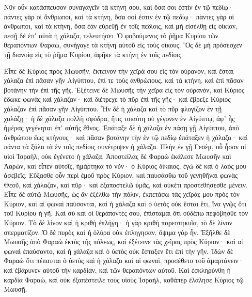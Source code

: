 {Νῦν οὖν κατάσπευσον συναγαγεῖν τὰ κτήνη σου, καὶ ὅσα σοι ἐστὶν ἐν τῷ πεδίῳ· πάντες γὰρ οἱ ἄνθρωποι, καὶ τὰ κτήνη, ὅσα σοί ἐστιν ἐν τῷ πεδίῳ· πὰντες γὰρ οἱ ἄνθρωποι, καὶ τὰ κτήνη, ὅσα ἐὰν εὑρεθῇ ἐν τοῖς πεδίοις, καὶ μὴ εἰσέλθῃ εἰς οἰκίαν, πεσῇ δὲ ἐπʼ αὐτὰ ἡ χάλαζα, τελευτήσει.
Ὁ φοβούμενος τὸ ῥῆμα Κυρίου τῶν θεραπόντων Φαραὼ, συνήγαγε τὰ κτήνη αὐτοῦ εἰς τοὺς οἴκους.
Ὃς δὲ μὴ πρόσεσχεν τῇ διανοίᾳ εἰς τὸ ῥῆμα Κυρίου, ἀφῆκε τὰ κτήνη ἐν τοῖς πεδίοις.
\par }{\PP {}Εἶπε δὲ Κύριος πρὸς Μωυσῆν, ἔκτεινον τὴν χεῖρά σου εἰς τὸν οὐρανὸν, καὶ ἔσται χάλαζα ἐπὶ πᾶσαν γῆν Αἰγύπτου, ἐπί τε τοὺς ἀνθρώπους, καὶ τὰ κτήνη, καὶ ἐπὶ πᾶσαν βοτάνην τὴν ἐπὶ τῆς γῆς.
Ἐξέτεινε δὲ Μωυσῆς τὴν χεῖρα εἰς τὸν οὐρανὸν, καὶ Κύριος ἔδωκε φωνὰς καὶ χάλαζαν· καὶ διέτρεχε τὸ πῦρ ἐπὶ τῆς γῆς· καὶ ἔβρεξε Κύριος χάλαζαν ἐπὶ πᾶσαν γῆν Αἰγύπτου.
Ἦν δὲ ἡ χάλαζα καὶ τὸ πῦρ φλογίζον ἐν τῇ χαλάζῃ· ἡ δὲ χάλαζα πολλὴ σφόδρα, ἥτις τοιαύτη οὐ γέγονεν ἐν Αἰγύπτῳ, ἀφʼ ἧς ἡμέρας γεγένηται ἐπʼ αὐτῆς ἔθνος.
Ἐπάταξε δὲ ἡ χάλαζα ἐν πάσῃ γῇ Αἰγύπτου, ἀπὸ ἀνθρώπου ἕως κτήνους· καὶ πᾶσαν βοτάνην τὴν ἐν τῷ πεδίῳ ἐπάταξεν ἡ χάλαζα· καὶ πάντα τὰ ξύλα τὰ ἐν τοῖς πεδίοις συνέτριψεν ἡ χάλαζα.
Πλὴν ἐν γῇ Γεσὲμ, οὗ ἦσαν οἱ υἱοὶ Ἰσραὴλ, οὐκ ἐγένετο ἡ χάλαζα.
Ἀποστείλας δὲ Φαραὼ ἐκάλεσε Μωυσῆν καὶ Ἀαρὼν, καὶ εἶπεν αὐτοῖς, ἡμάρτηκα τὸ νῦν· ὁ Κύριος δίκαιος, ἐγὼ δὲ καὶ ὁ λαός μου ἀσεβεῖς.
Εὔξασθε οὖν περὶ ἐμοῦ πρὸς Κύριον, καὶ παυσάσθω τοῦ γενηθῆναι φωνὰς Θεοῦ, καὶ χάλαζαν, καὶ πῦρ· καὶ ἐξαποστελῶ ὑμᾶς, καὶ οὐκέτι προστεθήσεσθε μένειν.
Εἶπε δὲ αὐτῷ Μωυσῆς, ὡς ἂν ἐξέλθω τὴν πόλιν, ἐκπετάσω τὰς χεῖράς μου πρὸς τὸν Κύριον, καὶ αἱ φωναὶ παύσονται, καὶ ἡ χὰλαζα καὶ ὁ ὑετὸς οὐκ ἔσται ἔτι, ἵνα γνῷς ὅτι τοῦ Κυρίου ἡ γῆ.
Καὶ σὺ καὶ οἱ θεράποντές σου, ἐπίσταμαι ὅτι οὐδέπω πεφόβησθε τὸν Κύριον.
Τὸ δὲ λίνον καὶ ἡ κριθὴ ἐπλήγη· ἡ γὰρ κριθὴ παρεστηκυῖα, τὸ δὲ λίνον σπερματίζον.
Ὁ δὲ πυρὸς καὶ ἡ ὀλύρα οὐκ ἐπληγησαν, ὄψιμα γὰρ ἦν.
Ἐξῆλθε δὲ Μωυσῆς ἀπὸ Φαραὼ ἐκτὸς τῆς πόλεως, καὶ ἐξέτεινε τὰς χεῖρας πρὸς Κύριον· καὶ αἱ φωναὶ ἐπαύσαντο, καὶ ἡ χάλαζα καὶ ὁ ὑετὸς οὐκ ἔσταξεν ἔτι ἐπὶ τὴν γῆν.
Ἰδὼν δὲ Φαραὼ ὅτι πέπαυται ὁ ὑετὸς καὶ ἡ χάλαζα καὶ αἱ φωναὶ, προσέθετο τοῦ ἁμαρτάνειν· καὶ ἐβάρυνεν αὐτοῦ τὴν καρδίαν, καὶ τῶν θεραπόντων αὐτοῦ.
Καὶ ἐσκληρύνθη ἡ καρδία Φαραὼ, καὶ οὐκ ἐξαπέστειλε τοὺς υἱοὺς Ἰσραὴλ, καθάπερ ἐλάλησε Κύριος τῷ Μωυσῇ.

}
